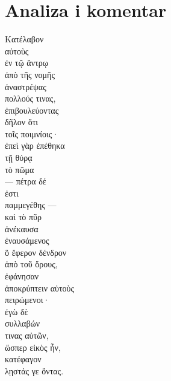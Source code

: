 \section*{Analiza i komentar}



{\large
\begin{greek}
\noindent Κατέλαβον \\
\tabto{2em} αὐτοὺς \\
\tabto{2em} ἐν τῷ ἄντρῳ \\
ἀπὸ τῆς νομῆς \\
ἀναστρέψας \\
\tabto{2em} πολλούς τινας, \\
\tabto{2em} ἐπιβουλεύοντας \\
\tabto{4em} δῆλον ὅτι \\
\tabto{4em} τοῖς ποιμνίοις·\\
ἐπεὶ γὰρ ἐπέθηκα \\
\tabto{2em} τῇ θύρᾳ \\
\tabto{2em} τὸ πῶμα\\
— πέτρα δέ \\
ἐστι \\
\tabto{2em} παμμεγέθης —\\

καὶ τὸ πῦρ \\
ἀνέκαυσα \\
\tabto{2em} ἐναυσάμενος \\
\tabto{4em} ὃ ἔφερον δένδρον \\
\tabto{6em} ἀπὸ τοῦ ὄρους, \\
ἐφάνησαν \\
\tabto{2em} ἀποκρύπτειν αὑτοὺς \\
\tabto{2em} πειρώμενοι·\\
ἐγὼ δὲ \\
\tabto{2em} συλλαβών \\
\tabto{4em} τινας αὐτῶν, \\
ὥσπερ εἰκὸς ἦν, \\
κατέφαγον \\
\tabto{2em} λῃστάς γε ὄντας.\\

\end{greek}
}


